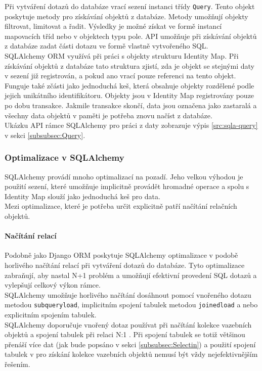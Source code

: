 \documentclass[ing,male,java,dept456]{diploma}						%
\begin{document}
Při vytváření dotazů do databáze vrací sezení instanci třídy \lstinline[style=inlinepython]|Query|. Tento objekt poskytuje metody pro získávání objektů z databáze. Metody umožňují objekty filtrovat, limitovat a řadit. Výsledky je možné získat ve formě instancí mapovacích tříd nebo v objektech typu pole. API umožňuje při získávání objektů z databáze zadat části dotazu ve formě vlastně vytvořeného SQL. \\
SQLAlchemy ORM využívá při práci s objekty strukturu Identity Map. Při získávání objektů z databáze tato struktura zjistí, zda je objekt se stejnými daty v sezení již registrován, a pokud ano vrací pouze referenci na tento objekt. Funguje také zčásti jako jednoduchá keš, která obsahuje objekty rozdělené podle jejich unikátního identifikátoru. Objekty jsou v Identity Map registrovány pouze po dobu transakce. Jakmile transakce skončí, data jsou označena jako zastaralá a všechny data objektů v paměti je potřeba znovu načíst z databáze. \\
Ukázku API rámce SQLAlchemy pro práci z daty zobrazuje výpis \ref{src:sqla-query} v sekci \ref{subsubsec:Query}.

\subsubsection{Optimalizace v SQLAlchemy}
\label{subsubsec:sqla-opt}

SQLAlchemy provádí mnoho optimalizací na pozadí. Jeho velkou výhodou je použití sezení, které umožňuje implicitně provádět hromadné operace a spolu s Identity Map slouží jako jednoduchá keš pro data. \\
Mezi optimalizace, které je potřeba určit explicitně patří načítání relačních objektů.

\paragraph{Načítání relací}
Podobně jako Django ORM poskytuje SQLAlchemy optimalizace v podobě horlivého načítání relací při vytváření dotazů do databáze. Tyto optimalizace zabraňují, aby nastal N+1 problém a umožňují efektivní provedení SQL dotazů a vylepšují celkový výkon rámce. \\
SQLAlchemy umožňuje horlivého načítání dosáhnout pomocí vnořeného dotazu metodou \lstinline[style=inlinepython]|subqueryload|, implicitním spojení tabulek metodou \lstinline[style=inlinepython]|joinedload| a nebo explicitním spojením tabulek. \\
SQLAlchemy doporučuje vnořený dotaz používat při načítání kolekce vazebních objektů a spojení tabulek při relaci N:1 \cite{sqla-doc}. Při spojení tabulek se totiž většinou přenáší více dat (jak bude popsáno v sekci \ref{subsubsec:Selectin}) a použití spojení tabulek v pro získání kolekce vazebních objektů nemusí být vždy nejefektivnějším řešením.
\end{document}
